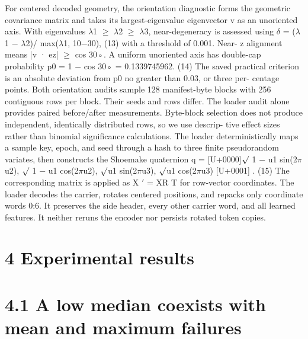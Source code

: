 \documentclass[11pt]{article}
\begin{document}
For centered decoded geometry, the orientation diagnostic forms the geometric covariance matrix
and takes its largest-eigenvalue eigenvector v as an unoriented axis. With eigenvalues \ensuremath{\lambda}1 \ensuremath{\geq} \ensuremath{\lambda}2 \ensuremath{\geq} \ensuremath{\lambda}3,
near-degeneracy is assessed using
\ensuremath{\delta} = (\ensuremath{\lambda}1 \ensuremath{-} \ensuremath{\lambda}2)/ max(\ensuremath{\lambda}1, 10\ensuremath{-}30), (13)
with a threshold of 0.001. Near- z alignment means |v · ez| \ensuremath{\geq} cos 30◦. A uniform unoriented axis
has double-cap probability
p0 = 1 \ensuremath{-} cos 30◦ = 0.1339745962. (14)
The saved practical criterion is an absolute deviation from p0 no greater than 0.03, or three per-
centage points.
Both orientation audits sample 128 manifest-byte blocks with 256 contiguous rows per block.
Their seeds and rows differ. The loader audit alone provides paired before/after measurements.
Byte-block selection does not produce independent, identically distributed rows, so we use descrip-
tive effect sizes rather than binomial significance calculations.
The loader deterministically maps a sample key, epoch, and seed through a hash to three finite
pseudorandom variates, then constructs the Shoemake quaternion
q =
[U+0000]\ensuremath{\surd}
1 \ensuremath{-} u1 sin(2\ensuremath{\pi}u2),
\ensuremath{\surd}
1 \ensuremath{-} u1 cos(2\ensuremath{\pi}u2),
\ensuremath{\surd}u1 sin(2\ensuremath{\pi}u3), \ensuremath{\surd}u1 cos(2\ensuremath{\pi}u3)
[U+0001]
. (15)
The corresponding matrix is applied as X \ensuremath{\prime} = XR T for row-vector coordinates. The loader decodes
the carrier, rotates centered positions, and repacks only coordinate words 0:6. It preserves the side
header, every other carrier word, and all learned features. It neither reruns the encoder nor persists
rotated token copies.

\section*{4 Experimental results}


\section*{4.1 A low median coexists with mean and maximum failures}
\end{document}
